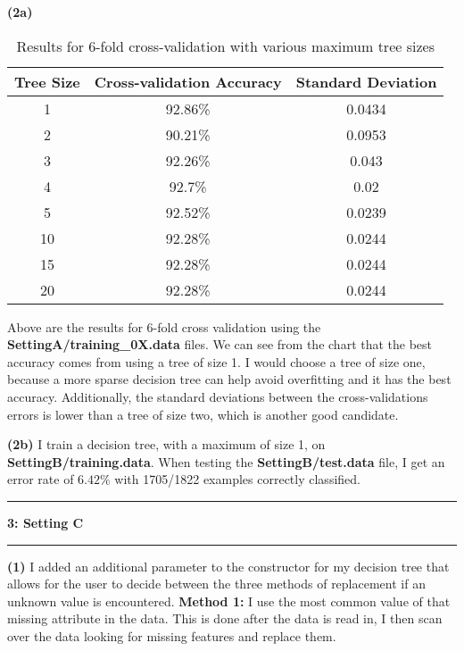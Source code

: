 \documentclass[11pt]{article}
\newcommand\question[2]{\vspace{.25in}\hrule\textbf{#1: #2}\vspace{.5em}\hrule\vspace{.10in}}
\renewcommand\part[1]{\vspace{.10in}\textbf{(#1)}}
\begin{document}

\part{2a}
\begin{table}[H]
\centering
\begin{tabular}{| c | c | c |}
\hline
Tree Size& Cross-validation Accuracy & Standard Deviation\\
\hline
1 & 92.86\% & 0.0434\\
2 & 90.21\% & 0.0953\\
3 & 92.26\% & 0.043\\
4 & 92.7\% & 0.02\\
5 & 92.52\% & 0.0239\\
10 & 92.28\% & 0.0244\\
15 & 92.28\% & 0.0244\\
20 & 92.28\% & 0.0244\\
\hline
\end{tabular}
\caption{Results for 6-fold cross-validation with various maximum tree sizes}
\end{table}
Above are the results for 6-fold cross validation using the \textbf{SettingA/training\_0X.data} files. We can see from the chart that the best accuracy comes from using a tree of size 1. I would choose a tree of size one, because a more sparse decision tree can help avoid overfitting and it has the best accuracy. Additionally, the standard deviations between the cross-validations errors is lower than a tree of size two, which is another good candidate.


\part{2b} I train a decision tree, with a maximum of size 1, on \textbf{SettingB/training.data}. When testing the \textbf{SettingB/test.data} file, I get an error rate of $6.42\%$ with 1705/1822 examples correctly classified.

\newpage

\question{3}{Setting C}

\part{1} I added an additional parameter to the constructor for my decision tree that allows for the user to decide between the three methods of replacement if an unknown value is encountered. \newline\newline
	\textbf{Method 1:} I use the most common value of that missing attribute in the data. This is done after the data is read in, I then scan over the data looking for missing features and replace them. \newline
	
\end{document}
